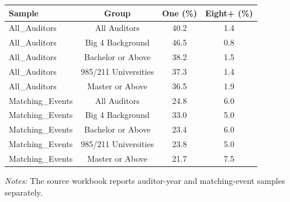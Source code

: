 \documentclass[10pt]{article}
\begin{document}
\begin{minipage}{19cm}\fontsize{10}{12}\selectfont\setlength{\tabcolsep}{4pt}\renewcommand{\arraystretch}{1.12}


\centering
{}
\begin{threeparttable}
\begin{tabular}{p{}ccc}
\toprule
Sample & Group & One (\%) & Eight+ (\%) \\
\midrule
All\_Auditors & All Auditors & 40.2 & 1.4 \\
All\_Auditors & Big 4 Background & 46.5 & 0.8 \\
All\_Auditors & Bachelor or Above & 38.2 & 1.5 \\
All\_Auditors & 985/211 Universities & 37.3 & 1.4 \\
All\_Auditors & Master or Above & 36.5 & 1.9 \\
Matching\_Events & All Auditors & 24.8 & 6.0 \\
Matching\_Events & Big 4 Background & 33.0 & 5.0 \\
Matching\_Events & Bachelor or Above & 23.4 & 6.0 \\
Matching\_Events & 985/211 Universities & 23.8 & 5.0 \\
Matching\_Events & Master or Above & 21.7 & 7.5 \\
\bottomrule
\end{tabular}
\begin{tablenotes}\fontsize{9}{11}\selectfont
\item \raggedright \fontsize{9}{11}\selectfont \textit{Notes:} The source workbook reports auditor-year and matching-event samples separately.
\end{tablenotes}
\end{threeparttable}

\end{minipage}
\end{document}
